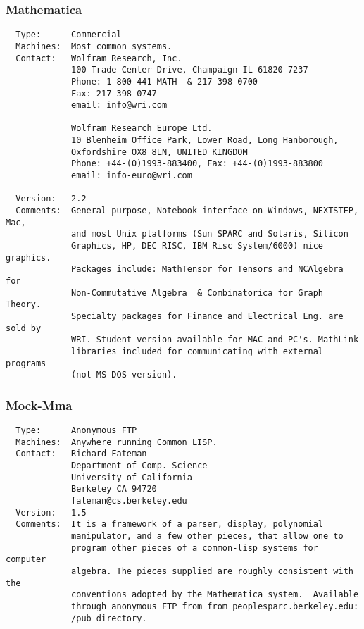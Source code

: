 \subsubsection{Mathematica}
\begin{verbatim}
  Type:      Commercial
  Machines:  Most common systems.
  Contact:   Wolfram Research, Inc.
             100 Trade Center Drive, Champaign IL 61820-7237
             Phone: 1-800-441-MATH  & 217-398-0700
             Fax: 217-398-0747
             email: info@wri.com

             Wolfram Research Europe Ltd.
             10 Blenheim Office Park, Lower Road, Long Hanborough,
             Oxfordshire OX8 8LN, UNITED KINGDOM
             Phone: +44-(0)1993-883400, Fax: +44-(0)1993-883800
             email: info-euro@wri.com

  Version:   2.2
  Comments:  General purpose, Notebook interface on Windows, NEXTSTEP, Mac,
             and most Unix platforms (Sun SPARC and Solaris, Silicon
             Graphics, HP, DEC RISC, IBM Risc System/6000) nice graphics.
             Packages include: MathTensor for Tensors and NCAlgebra for
             Non-Commutative Algebra  & Combinatorica for Graph Theory.
             Specialty packages for Finance and Electrical Eng. are sold by
             WRI. Student version available for MAC and PC's. MathLink
             libraries included for communicating with external programs
             (not MS-DOS version).
\end{verbatim}

\subsubsection{Mock-Mma}
\begin{verbatim}
  Type:      Anonymous FTP
  Machines:  Anywhere running Common LISP.
  Contact:   Richard Fateman
             Department of Comp. Science
             University of California
             Berkeley CA 94720
             fateman@cs.berkeley.edu
  Version:   1.5
  Comments:  It is a framework of a parser, display, polynomial
             manipulator, and a few other pieces, that allow one to
             program other pieces of a common-lisp systems for computer
             algebra. The pieces supplied are roughly consistent with the
             conventions adopted by the Mathematica system.  Available
             through anonymous FTP from from peoplesparc.berkeley.edu:
             /pub directory.
\end{verbatim}

